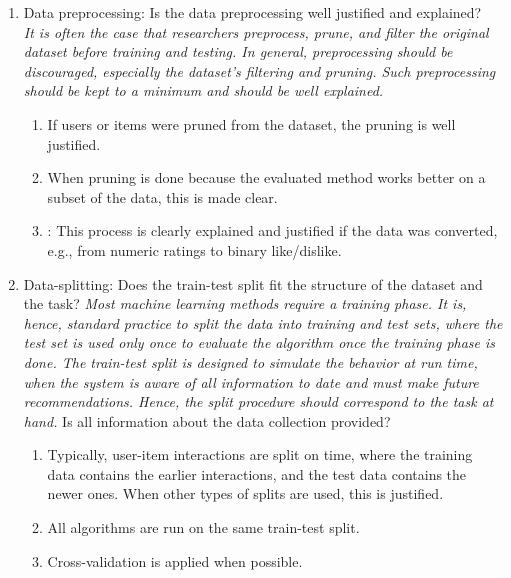 \documentclass{article}
\begin{document}
\begin{enumerate}
    \item Data preprocessing: Is the data preprocessing well justified and explained? \\
    \emph{It is often the case that researchers preprocess, prune, and filter the original dataset before training and testing. In general, preprocessing should be discouraged, especially the dataset's filtering and pruning. Such preprocessing should be kept to a minimum and should be well explained.}
    \begin{enumerate} [label*=\arabic*.]
        \item If users or items were pruned from the dataset, the pruning is well justified.
        \item When pruning is done because the evaluated method works better on a subset of the data, this is made clear.
        \item: This process is clearly explained and justified if the data was converted, e.g., from numeric ratings to binary like/dislike.
    \end{enumerate}


    \item Data-splitting: Does the train-test split fit the structure of the dataset and the task?
    \emph{Most machine learning methods require a training phase. It is, hence, standard practice to split the data into training and test sets, where the test set is used only once to evaluate the algorithm once the training phase is done. The train-test split is designed to simulate the behavior at run time, when the system is aware of all information to date and must make future recommendations. Hence, the split procedure should correspond to the task at hand. }
    Is all information about the data collection provided?\\ 
    \begin{enumerate} [label*=\arabic*.]
        \item Typically, user-item interactions are split on time, where the training data contains the earlier interactions, and the test data contains the newer ones. When other types of splits are used, this is justified.
        \item All algorithms are run on the same train-test split.
        \item Cross-validation is applied when possible.
    \end{enumerate}
    

\end{enumerate}
\end{document}
